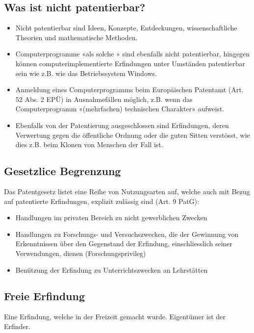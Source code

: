 \subsection{Was ist nicht patentierbar?}

\begin{itemize}
	\tightlist
	\item Nicht patentierbar sind Ideen, Konzepte, Entdeckungen,
	wissenschaftliche Theorien und mathematische Methoden.
	\item Computerprogramme «als solche » sind ebenfalls nicht patentierbar,
	hingegen können computerimplementierte Erfindungen unter Umständen
	patentierbar sein wie z.B. wie das Betriebssystem Windows.
	\item Anmeldung eines Computerprogramms beim Europäischen Patentamt (Art. 52
	Abs. 2 EPÜ) in Ausnahmefällen möglich, z.B. wenn das Computerprogramm
	«(mehrfachen) technischen Charakter» aufweist.
	\item Ebenfalls von der Patentierung ausgeschlossen sind Erfindungen, deren
	Verwertung gegen die öffentliche Ordnung oder die guten Sitten
	verstösst, wie dies z.B. beim Klonen von Menschen der Fall ist.
\end{itemize}


\subsection{Gesetzlice Begrenzung}
\label{sec:Patentrecht-Begrenzug}

Das Patentgesetz listet eine Reihe von Nutzungsarten auf, welche auch
mit Bezug auf patentierte Erfindungen, explizit zulässig sind (Art. 9
PatG):
\begin{itemize}
	\tightlist
	\item Handlungen im privaten Bereich zu nicht gewerblichen Zwecken
	\item Handlungen zu Forschungs- und Versuchszwecken, die der Gewinnung von
	Erkenntnissen über den Gegenstand der Erfindung, einschliesslich seiner
	Verwendungen, dienen (Forschungsprivileg)
	\item Benützung der Erfindung zu
	Unterrichtszwecken an Lehrstätten
\end{itemize}

\subsection{Freie Erfindung}
Eine Erfindung, welche in der Freizeit gemacht wurde. Eigentümer ist der Erfinder.

